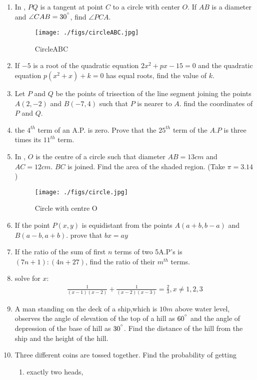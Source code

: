 \documentclass{article}
\begin{document}
\begin{enumerate}
	\item In , $PQ$ is a tangent at point $C$ to a circle with center $O$. If $AB$ is a diameter and $\angle CAB = 30^{\degree}$, find $\angle PCA$.
	\begin{figure}[H]
          \texttt{[image: ./figs/circleABC.jpg]}
           \caption{CircleABC}
            \label{fig:circleABC}
         \end{figure}
 
\item If $-5$ is a root of the quadratic equation $2x^2+px-15=0$ and the quadratic equation $p(x^2+x)+k=0$ has equal roots, find the value of $k$.
\item Let $P$ and $Q$ be the points of trisection of the line segment joining the points $A(2, -2)$ and $B(-7,4)$ such that $P$ is nearer to $A$. find the coordinates of $P$ and $Q$.
\item the $4^{th}$ term of an A.P. is zero. Prove that the $25^{th}$ term of the $A.P$ is three times its $11^{th}$ term.
\item In , $O$ is the centre of a circle such that diameter $AB=13 cm$ and $AC=12 cm$. $BC$ is joined. Find the area of the shaded region. (Take $\pi=3.14$)
 \begin{figure}[H]
   \texttt{[image: ./figs/circle.jpg]}
    \caption{Circle with centre O}
     \label{fig:circle}
      \end{figure}
\item If the point $P(x, y)$ is equidistant from the points $A(a+b, b-a)$ and $B(a-b, a+b)$. prove that $bx=ay$
\item If the ratio of the sum of first $n$ terms of two 5A.P's is $(7n+1):(4n+27)$, find the ratio of their $m^{th}$ terms.
\item solve for $x$:
	\begin{align}
		\frac{1}{(x-1)(x-2)}+\frac{1}{(x-2)(x-3)}=\frac{2}{3},x \not= 1,2,3 
	\end{align}
\item A man standing on the deck of a ship,which is $10 m$ above water level, observes the angle of elevation of the top of a hill as $60^{\degree}$ and the angle of depression of the base of hill as $30^{\degree}$. Find the distance of the hill from the ship and the height of the hill.
\item Three different coins are tossed together. Find the probability of getting
	      \begin{enumerate}[label=\roman*]
 \item exactly two heads,
							

\end{enumerate}
\end{enumerate}
\end{document}

